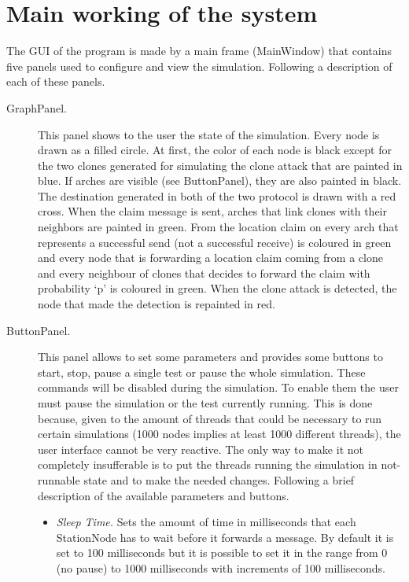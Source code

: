 \section{Main working of the system}
The GUI of the program is made by a main frame (MainWindow) that contains five
panels used to configure and view the simulation. Following a description of 
each of these panels.

\begin{description}
  \item[GraphPanel.] This panel shows to the user the state of the simulation.
  Every node is drawn as a filled circle. At first, the color of each node is
  black except for the two clones generated for simulating the clone attack
  that are painted in blue. If arches are visible (see ButtonPanel), they are
  also painted in black. The destination generated in both of the two protocol 
  is drawn with a red cross. 
  When the claim message is sent, arches that link clones with their neighbors
  are painted in green. From the location claim on every arch that represents
  a successful send (not a successful receive) is coloured in green and every
  node that is forwarding a location claim coming from a clone and every 
  neighbour of clones that decides to forward the claim with probability `p' is
  coloured in green. When the clone attack is detected, the node that made
  the detection is repainted in red.
  \item[ButtonPanel.] This panel allows to set some parameters and provides some
  buttons to start, stop, pause a single test or pause the whole simulation.
  These commands will be disabled during the simulation. To enable them the
  user must pause the simulation or the test currently running. This is done
  because, given to the amount of threads that could be necessary to run certain
  simulations (1000 nodes implies at least 1000 different threads), the user
  interface cannot be very reactive. The only way to make it not completely
  insufferable is to put the threads running the simulation in not-runnable state
  and to make the needed changes.
  Following a brief description of the available parameters and buttons.
  \begin{itemize}
    \item \textit{Sleep Time.} Sets the amount of time in milliseconds that each 
    StationNode has to wait before it forwards a message. By default it is set to
    100 milliseconds but it is possible to set it in the range from 0 (no pause)
    to 1000 milliseconds with increments of 100 milliseconds.

\end{itemize}
\end{description}
